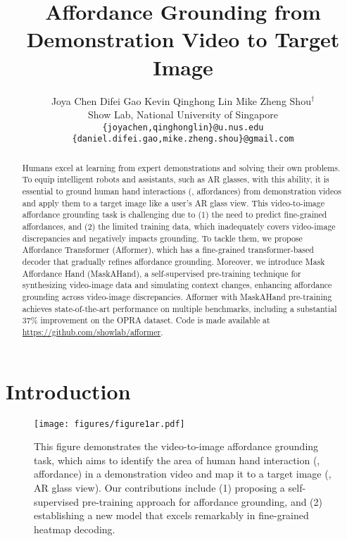 \documentclass[10pt,twocolumn,letterpaper]{article}
\makeatletter
\def\thanks#1{\protected@xdef\@thanks{\@thanks
        \protect\footnotetext{#1}}}
\newcommand{\authorskip}{\hspace{5mm}}
\makeatother
\begin{document}
\title{Affordance Grounding from Demonstration Video to Target Image \vspace{-3mm}}

\author{Joya Chen \authorskip Difei Gao \authorskip Kevin Qinghong Lin \authorskip Mike Zheng Shou$^{\dagger}$\thanks{$^{\dagger}$Corresponding Author.}\\[1mm]
Show Lab, National University of Singapore \\
\footnotesize \texttt{\{joyachen,qinghonglin\}@u.nus.edu \authorskip \{daniel.difei.gao,mike.zheng.shou\}@gmail.com}
}

\maketitle

\begin{abstract}
Humans excel at learning from expert demonstrations and solving their own problems. To equip intelligent robots and assistants, such as AR glasses, with this ability, it is essential to ground human hand interactions (\ie, affordances) from demonstration videos and apply them to a target image like a user's AR glass view. This video-to-image affordance grounding task is challenging due to (1) the need to predict fine-grained affordances, and (2) the limited training data, which inadequately covers video-image discrepancies and negatively impacts grounding. To tackle them, we propose Affordance Transformer (Afformer), which has a fine-grained transformer-based decoder that gradually refines affordance grounding. Moreover, we introduce Mask Affordance Hand (MaskAHand), a self-supervised pre-training technique for synthesizing video-image data and simulating context changes, enhancing affordance grounding across video-image discrepancies. Afformer with MaskAHand pre-training achieves state-of-the-art performance on multiple benchmarks, including a substantial 37\% improvement on the OPRA dataset. Code is made available at \hyperlink{https://github.com/showlab/afformer}{https://github.com/showlab/afformer}.
\end{abstract}

\section{Introduction}

\begin{figure}[t]
    \centering
    \texttt{[image: figures/figure1ar.pdf]}
    \vspace{-0.6cm}
    \caption{This figure demonstrates the video-to-image affordance grounding task, which aims to identify the area of human hand interaction (\ie, affordance) in a demonstration video and map it to a target image (\eg, AR glass view). Our contributions include (1) proposing a self-supervised pre-training approach for affordance grounding, and (2) establishing a new model that excels remarkably in fine-grained heatmap decoding. \vspace{-0.6cm}}
    \label{figure1}
\end{figure}
\end{document}
